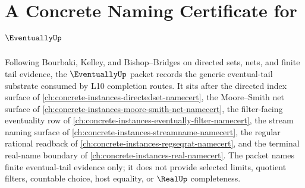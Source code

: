 \chapter{A Concrete Naming Certificate for $\EventuallyUp$}
\label{ch:concrete-instances-eventually-namecert}

Following Bourbaki, Kelley, and Bishop--Bridges on directed sets, nets, and finite tail evidence, the $\EventuallyUp$ packet records the generic eventual-tail substrate consumed by L10 completion routes. It sits after the directed index surface of \autoref{ch:concrete-instances-directedset-namecert}, the Moore--Smith net surface of \autoref{ch:concrete-instances-moore-smith-net-namecert}, the filter-facing eventuality row of \autoref{ch:concrete-instances-eventually-filter-namecert}, the stream naming surface of \autoref{ch:concrete-instances-streamname-namecert}, the regular rational readback of \autoref{ch:concrete-instances-regseqrat-namecert}, and the terminal real-name boundary of \autoref{ch:concrete-instances-real-namecert}. The packet names finite eventual-tail evidence only; it does not provide selected limits, quotient filters, countable choice, host equality, or $\RealUp$ completeness.

